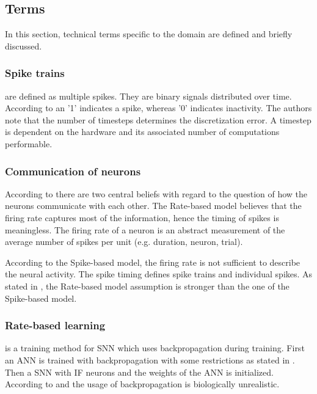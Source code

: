 \newcommand\rbModel{Rate-based model}
\newcommand\sbModel{Spike-based model}
\subsection{Terms}
\label{subsec:terms}

In this section, technical terms specific to the domain are defined and briefly discussed.

\subsubsection{Spike trains}
are defined as multiple spikes.
They are binary signals distributed over time.
According to \cite{DIET_SNN} an '1' indicates a spike, whereas '0' indicates inactivity.
The authors note that the number of timesteps determines the discretization error.
A timestep is dependent on the hardware and its associated number of computations performable.

\subsubsection{Communication of neurons}
According to \cite{spike_vs_rate} there are two central beliefs with regard to the question of how the neurons communicate with each other.
The \rbModel{} believes that the firing rate captures most of the information, hence the timing of spikes is meaningless.
The firing rate of a neuron is an abstract measurement of the average number of spikes per unit (e.g. duration, neuron, trial).

According to the \sbModel{}, the firing rate is not sufficient to describe the neural activity.
The spike timing defines spike trains and individual spikes.
As stated in \cite{spike_vs_rate}, the \rbModel{} assumption is stronger than the one of the \sbModel{}.

\subsubsection{Rate-based learning} is a training method for \ac{SNN} which uses backpropagation during training. 
First an \ac{ANN} is trained with backpropagation with some restrictions as stated in \cite{DIET_SNN}.
Then a \ac{SNN} with \ac{IF} neurons and the weights of the \ac{ANN} is initialized.
According to \cite{SNN} and \cite{STDP_like} the usage of backpropagation is biologically unrealistic.
